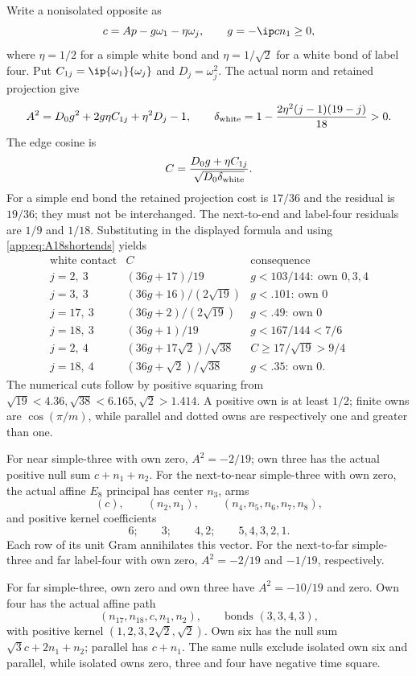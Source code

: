 Write a nonisolated opposite as
\[
 c=A p-g\omega_1-\eta\omega_j,\qquad g=-\ip c{n_1}\geq0,
\]
where \(\eta=1/2\) for a simple white bond and \(\eta=1/\sqrt2\)
for a white bond of label four. Put \(C_{1j}=\ip{\omega_1}{\omega_j}\)
and \(D_j=\omega_j^2\). The actual norm and retained projection give
\[
 A^2=D_0g^2+2g\eta C_{1j}+\eta^2D_j-1,\qquad
 \delta_{\rm white}
 =1-\frac{2\eta^2(j-1)(19-j)}{18}>0.
\]
The edge cosine is
\[
 C=\frac{D_0g+\eta C_{1j}}{\sqrt{D_0\delta_{\rm white}}}.
\]
For a simple end bond the retained projection cost is \(17/36\)
and the residual is \(19/36\); they must not be interchanged.
The next-to-end and label-four residuals are \(1/9\) and \(1/18\).
Substituting in the displayed formula and using
\eqref{app:eq:A18shortends} yields
\[
\begin{array}{c|c|l}
\text{white contact}&C&\text{consequence}\\ \hline
j=2,\ 3&(36g+17)/19&g<103/144:\ \text{own }0,3,4\\
j=3,\ 3&(36g+16)/(2\sqrt{19})&g<.101:\ \text{own }0\\
j=17,\ 3&(36g+2)/(2\sqrt{19})&g<.49:\ \text{own }0\\
j=18,\ 3&(36g+1)/19&g<167/144<7/6\\
j=2,\ 4&(36g+17\sqrt2)/\sqrt{38}&C\geq17/\sqrt{19}>9/4\\
j=18,\ 4&(36g+\sqrt2)/\sqrt{38}&g<.35:\ \text{own }0 .
\end{array}
\]
The numerical cuts follow by positive squaring from
\(\sqrt{19}<4.36,\sqrt{38}<6.165,\sqrt2>1.414\).
A positive own is at least \(1/2\); finite owns are
\(\cos(\pi/m)\), while parallel and dotted owns are respectively
one and greater than one.

For near simple-three with own zero, \(A^2=-2/19\); own three has
the actual positive null sum \(c+n_1+n_2\). For the next-to-near
simple-three with own zero, the actual affine \(E_8\) principal
has center \(n_3\), arms
\[
 (c),\qquad(n_2,n_1),\qquad(n_4,n_5,n_6,n_7,n_8),
\]
and positive kernel coefficients
\[
 6;\qquad3;\qquad4,2;\qquad5,4,3,2,1.
\]
Each row of its unit Gram annihilates this vector. For the
next-to-far simple-three and far label-four with own zero,
\(A^2=-2/19\) and \(-1/19\), respectively.

For far simple-three, own zero and own three have
\(A^2=-10/19\) and zero. Own four has the actual affine path
\[
 (n_{17},n_{18},c,n_1,n_2),\qquad
 \text{bonds }(3,3,4,3),
\]
with positive kernel \((1,2,3,2\sqrt2,\sqrt2)\).
Own six has the null sum \(\sqrt3c+2n_1+n_2\);
parallel has \(c+n_1\). The same nulls exclude isolated
own six and parallel, while isolated owns zero, three and four
have negative time square.

